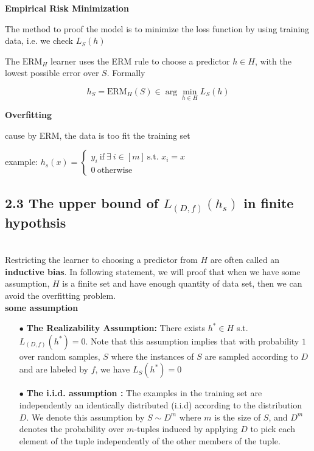 \textbf{Empirical Risk Minimization}

The method to proof the model is to minimize the loss function by using training data, i.e. we check $L_S(h)$

The $\text{ERM}_H$ learner uses the ERM rule to choose a predictor $h \in H$, with the lowest possible error over $S$. Formally

$$h_S = \text{ERM}_H(S) \in \arg\min_{h \in H}L_S(h)$$

\textbf{Overfitting}

cause by ERM, the data is too fit the training set

example: $h_s(x) = \begin{cases}
	y_i~\text{if}~\exists~i \in [m]~\text{s.t. } x_i = x\\
	0~\text{otherwise}
\end{cases}$

\subsection*{2.3 The upper bound of $L_{(D,f)}(h_s)$ in finite hypothsis} $ $\\

Restricting the learner to choosing a predictor from $H$ are often called an \textbf{inductive bias}. In following statement, we will proof that when we have some assumption, $H$ is a finite set and have enough quantity of data set, then we can avoid the overfitting problem. \\

\textbf{some assumption}

\begin{enumerate}
	\item[$\bullet$] \textbf{The Realizability Assumption:} There exists $h^* \in H$ s.t. $L_{(D,f)}(h^*) = 0$. Note that this assumption implies that with probability $1$ over random samples, $S$ where the instances of $S$ are sampled according to $D$ and are labeled by $f$, we have $L_S(h^*) = 0$
	\item[$\bullet$] \textbf{The i.i.d. assumption :} The examples in the training set are independently an identically distributed (i.i.d) according to the distribution $D$. We denote this assumption by $S \sim D^m$ where $m$ is the size of $S$, and $D^m$ denotes the probability over $m$-tuples induced by applying $D$ to pick each element of the tuple independently of the other members of the tuple.
\end{enumerate}

